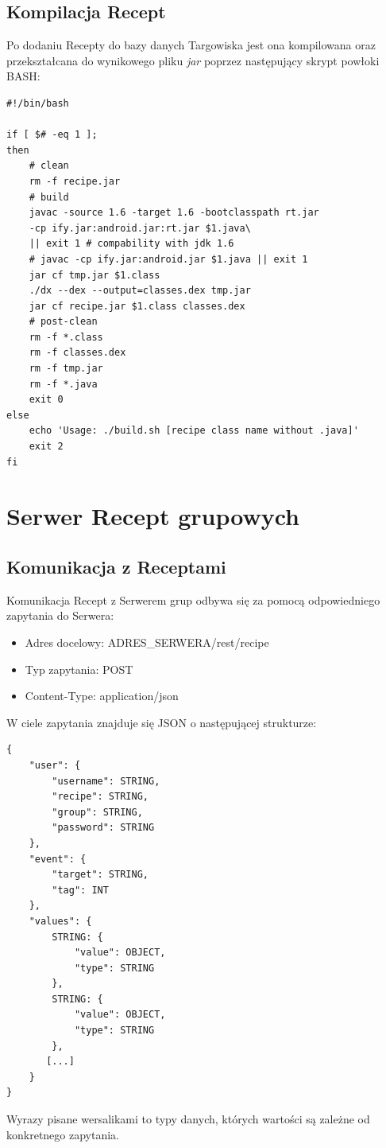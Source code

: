 \documentclass[11pt,a4paper,polish,thesis]{dcsbook}
\begin{document}
\subsection{Kompilacja Recept}
Po dodaniu Recepty do bazy danych Targowiska jest ona kompilowana oraz przekształcana do wynikowego pliku \emph{jar} poprzez następujący skrypt powłoki BASH:
\begin{verbatim}
#!/bin/bash

if [ $# -eq 1 ];
then
    # clean
    rm -f recipe.jar
    # build
    javac -source 1.6 -target 1.6 -bootclasspath rt.jar
    -cp ify.jar:android.jar:rt.jar $1.java\
    || exit 1 # compability with jdk 1.6
    # javac -cp ify.jar:android.jar $1.java || exit 1
    jar cf tmp.jar $1.class
    ./dx --dex --output=classes.dex tmp.jar
    jar cf recipe.jar $1.class classes.dex
    # post-clean
    rm -f *.class
    rm -f classes.dex
    rm -f tmp.jar
    rm -f *.java
    exit 0
else
    echo 'Usage: ./build.sh [recipe class name without .java]'
    exit 2
fi
\end{verbatim}
\section{Serwer Recept grupowych}
\subsection{Komunikacja z Receptami}
Komunikacja Recept z Serwerem grup odbywa się za pomocą odpowiedniego zapytania do Serwera:
\begin{itemize}
\item Adres docelowy: ADRES\_SERWERA/rest/recipe
\item Typ zapytania: POST
\item Content-Type: application/json
\end{itemize}

W ciele zapytania znajduje się JSON o następującej strukturze:
\begin{verbatim}
{
    "user": {
        "username": STRING,
        "recipe": STRING,
        "group": STRING,
        "password": STRING
    },
    "event": {
        "target": STRING,
        "tag": INT
    },
    "values": {
        STRING: {
            "value": OBJECT,
            "type": STRING
        },
        STRING: {
            "value": OBJECT,
            "type": STRING
        },
       [...]
    }
}
\end{verbatim}

Wyrazy pisane wersalikami to typy danych, których wartości są zależne od konkretnego zapytania.
\end{document}
